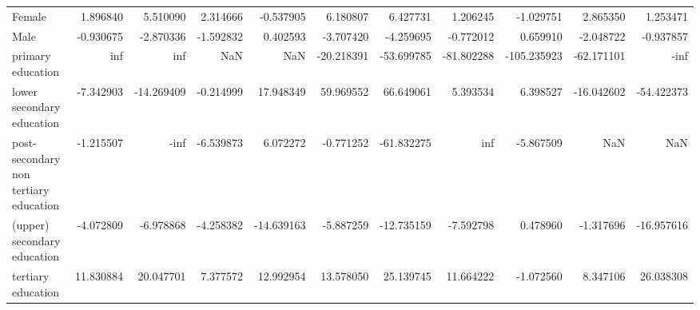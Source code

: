 \documentclass{article}
\begin{document}
\begin{table}[!htbp]
{\begin{tabular}{lrrrrrrrrrr}
Female                                &   1.896840 &   5.510090 &   2.314666 &   -0.537905 &   6.180807 &   6.427731 &   1.206245 &   -1.029751 &   2.865350 &    1.253471 \\
Male                                  &  -0.930675 &  -2.870336 &  -1.592832 &    0.402593 &  -3.707420 &  -4.259695 &  -0.772012 &    0.659910 &  -2.048722 &   -0.937857 \\
primary education                     &        inf &        inf &        NaN &         NaN & -20.218391 & -53.699785 & -81.802288 & -105.235923 & -62.171101 &        -inf \\
lower secondary education             &  -7.342903 & -14.269409 &  -0.214999 &   17.948349 &  59.969552 &  66.649061 &   5.393534 &    6.398527 & -16.042602 &  -54.422373 \\
post-secondary non tertiary education &  -1.215507 &       -inf &  -6.539873 &    6.072272 &  -0.771252 & -61.832275 &        inf &   -5.867509 &        NaN &         NaN \\
(upper) secondary education           &  -4.072809 &  -6.978868 &  -4.258382 &  -14.639163 &  -5.887259 & -12.735159 &  -7.592798 &    0.478960 &  -1.317696 &  -16.957616 \\
tertiary education                    &  11.830884 &  20.047701 &   7.377572 &   12.992954 &  13.578050 &  25.139745 &  11.664222 &   -1.072560 &   8.347106 &   26.038308 \\
\bottomrule
\end{tabular}

}
\end{table}
\end{document}
